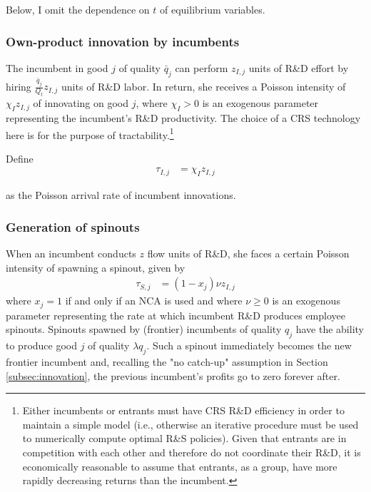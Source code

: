 \documentclass[11pt,english]{article}
\theoremstyle{remark}
\begin{document}
Below, I omit the dependence on $t$ of equilibrium variables. 

\subsubsection{Own-product innovation by incumbents} \label{subsubsec:OI}

The incumbent in good $j$ of quality $\bar{q}_{j}$ can perform $z_{I,j}$ units of R\&D effort by hiring $\frac{\bar{q}_{j}}{Q_t}z_{I,j}$ units of R\&D labor. In return, she receives a Poisson intensity of $\chi_I z_{I,j}$ of innovating on good $j$, where $\chi_I > 0$ is an exogenous parameter representing the incumbent's R\&D productivity. The choice of a CRS technology here is for the purpose of tractability.\footnote{Either incumbents or entrants must have CRS R\&D efficiency in order to maintain a simple model (i.e., otherwise an iterative procedure must be used to numerically compute optimal R\&S policies). Given that entrants are in competition with each other and therefore do not coordinate their R\&D, it is economically reasonable to assume that entrants, as a group, have more rapidly decreasing returns than the incumbent.}

Define
\begin{align}
	\tau_{I,j} &= \chi_I z_{I,j}
\end{align}

as the Poisson arrival rate of incumbent innovations.


\subsubsection{Generation of spinouts}

When an incumbent conducts $z$ flow units of R\&D, she faces a certain Poisson intensity of spawning a spinout, given by 
\begin{align*}
	\tau_{S,j} &= (1-x_{j}) \nu z_{I,j}
\end{align*} 
where $x_{j} = 1$ if and only if an NCA is used and where $\nu \ge 0$ is an exogenous parameter representing the rate at which incumbent R\&D produces employee spinouts. Spinouts spawned by (frontier) incumbents of quality $q_j$ have the ability to produce good $j$ of quality $\lambda q_j$. Such a spinout immediately becomes the new frontier incumbent and, recalling the "no catch-up" assumption in Section \ref{subsec:innovation}, the previous incumbent's profits go to zero forever after.
\end{document}
